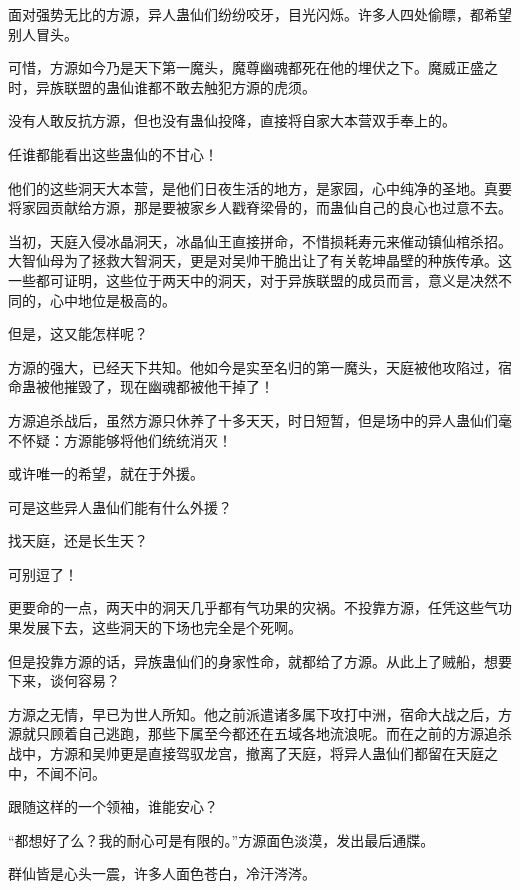 
\begin{this_body}

面对强势无比的方源，异人蛊仙们纷纷咬牙，目光闪烁。许多人四处偷瞟，都希望别人冒头。

可惜，方源如今乃是天下第一魔头，魔尊幽魂都死在他的埋伏之下。魔威正盛之时，异族联盟的蛊仙谁都不敢去触犯方源的虎须。

没有人敢反抗方源，但也没有蛊仙投降，直接将自家大本营双手奉上的。

任谁都能看出这些蛊仙的不甘心！

他们的这些洞天大本营，是他们日夜生活的地方，是家园，心中纯净的圣地。真要将家园贡献给方源，那是要被家乡人戳脊梁骨的，而蛊仙自己的良心也过意不去。

当初，天庭入侵冰晶洞天，冰晶仙王直接拼命，不惜损耗寿元来催动镇仙棺杀招。大智仙母为了拯救大智洞天，更是对吴帅干脆出让了有关乾坤晶壁的种族传承。这一些都可证明，这些位于两天中的洞天，对于异族联盟的成员而言，意义是决然不同的，心中地位是极高的。

但是，这又能怎样呢？

方源的强大，已经天下共知。他如今是实至名归的第一魔头，天庭被他攻陷过，宿命蛊被他摧毁了，现在幽魂都被他干掉了！

方源追杀战后，虽然方源只休养了十多天天，时日短暂，但是场中的异人蛊仙们毫不怀疑：方源能够将他们统统消灭！

或许唯一的希望，就在于外援。

可是这些异人蛊仙们能有什么外援？

找天庭，还是长生天？

可别逗了！

更要命的一点，两天中的洞天几乎都有气功果的灾祸。不投靠方源，任凭这些气功果发展下去，这些洞天的下场也完全是个死啊。

但是投靠方源的话，异族蛊仙们的身家性命，就都给了方源。从此上了贼船，想要下来，谈何容易？

方源之无情，早已为世人所知。他之前派遣诸多属下攻打中洲，宿命大战之后，方源就只顾着自己逃跑，那些下属至今都还在五域各地流浪呢。而在之前的方源追杀战中，方源和吴帅更是直接驾驭龙宫，撤离了天庭，将异人蛊仙们都留在天庭之中，不闻不问。

跟随这样的一个领袖，谁能安心？

“都想好了么？我的耐心可是有限的。”方源面色淡漠，发出最后通牒。

群仙皆是心头一震，许多人面色苍白，冷汗涔涔。


\end{this_body}
